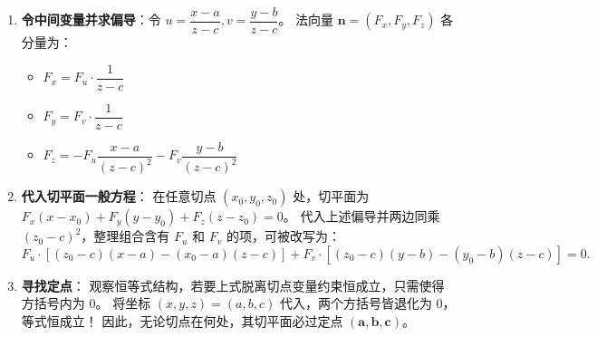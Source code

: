 \documentclass[lang=cn,11pt]{elegantbook}
\begin{document}
\begin{solution}
\begin{enumerate}
  \item \textbf{令中间变量并求偏导}：令 $u = \dfrac{x-a}{z-c}, v = \dfrac{y-b}{z-c}$。
  法向量 $\boldsymbol n = (F_x, F_y, F_z)$ 各分量为：
  \begin{itemize}
    \item $F_x = F_u \cdot \dfrac{1}{z-c}$
    \item $F_y = F_v \cdot \dfrac{1}{z-c}$
    \item $F_z = -F_u \dfrac{x-a}{(z-c)^2} - F_v \dfrac{y-b}{(z-c)^2}$
  \end{itemize}
  
  \item \textbf{代入切平面一般方程}：
  在任意切点 $(x_0,y_0,z_0)$ 处，切平面为 $F_x(x-x_0) + F_y(y-y_0) + F_z(z-z_0) = 0$。
  代入上述偏导并两边同乘 $(z_0-c)^2$，整理组合含有 $F_u$ 和 $F_v$ 的项，可被改写为：
  \[
  F_u \cdot \left[ (z_0-c)(x-a) - (x_0-a)(z-c) \right] + F_v \cdot \left[ (z_0-c)(y-b) - (y_0-b)(z-c) \right] = 0.
  \]
  
  \item \textbf{寻找定点}：
  观察恒等式结构，若要上式脱离切点变量约束恒成立，只需使得方括号内为 $0$。
  将坐标 $(x,y,z) = (a,b,c)$ 代入，两个方括号皆退化为 $0$，等式恒成立！
  因此，无论切点在何处，其切平面必过定点 $\mathbf{(a,b,c)}$。
\end{enumerate}
\end{solution}
\end{document}
